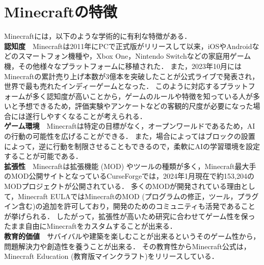 \section{Minecraftの特徴}\label{sec:minecraft_feature}
Minecraftには，以下のような学術的に有利な特徴がある．\\

\textbf{認知度}　Minecraftは2011年にPCで正式版がリリースして以来，iOSやAndroidなどのスマートフォン機種や，Xbox One，Nintendo Switchなどの家庭用ゲーム機，その他様々なプラットフォームに移植された．
また，2023年10月にはMinecraftの累計売り上げ本数が3億本を突破したことが公式ライブで発表され，世界で最も売れたインディーゲームとなった\cite{bib:minecraft_news}．
このように対応するプラットフォームが多く認知度が高いことから，ゲームのルールや特徴を知っている人が多いと予想できるため，評価実験やアンケートなどの客観的尺度が必要になった場合には遂行しやすくなることが考えられる．\\

\textbf{ゲーム環境}　Minecraftは特定の目標がなく，オープンワールドであるため，AIの行動の可能性を広げることができる．
また，場合によってはブロックの設置によって，逆に行動を制限させることもできるので，柔軟にAIの学習環境を設定することが可能である．\\

\textbf{拡張性}　Minecraftは拡張機能 (MOD) やツールの種類が多く，Minecraft最大手のMOD公開サイトとなっているCurseForge\cite{bib:curseforge}では，2024年1月現在で約153,204のMODプロジェクトが公開されている．
多くのMODが開発されている理由として，Minecraft EULA\cite{bib:eula}ではMinecraftのMOD (プログラムの修正，ツール，プラグイン含む)の追加を許可しており，開発のためのコミュニティも活発であることが挙げられる．
したがって，拡張性が高いため研究に合わせてゲーム性を保ったまま自由にMinecraftをカスタムすることが出来る．\\

\textbf{教育的価値}　サバイバルや建築を楽しむことが出来るというそのゲーム性から，問題解決力や創造性を養うことが出来る．
その教育性からMinecraft公式は，Minecraft Education (教育版マインクラフト)\cite{bib:minecraft_edu}をリリースしている． \\


